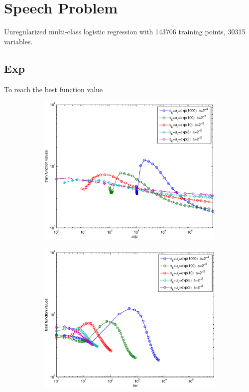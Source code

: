 \documentclass[12pt]{article}
\begin{document}
	
	\newpage
	
	\section{Speech Problem} 
	
	Unregularized multi-class logistic regression with 143706 training points, 30315 variables. 
	
	\subsection{Exp}
	To reach the best function value
	\begin{figure}[H]
	\begin{subfigure}[b]{.5\linewidth}
		        \includegraphics[width=4in]{Figures/18-1-1.eps}
	\end{subfigure}%
	\begin{subfigure}[b]{.5\linewidth}
		        \includegraphics[width=4in]{Figures/18-1-2.eps}
	\end{subfigure}%


\end{figure}
\end{document}
